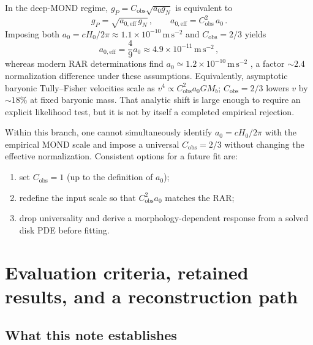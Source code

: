 \documentclass[aps,prd,reprint,superscriptaddress,nofootinbib,floatfix,showkeys]{revtex4-2}
\newcommand{\Cobs}{C_{\mathrm{obs}}}
\newcommand{\azero}{a_{0}}
\newcommand{\Hzero}{H_{0}}
\begin{document}
In the deep-MOND regime, \(g_{P}=\Cobs\sqrt{\azero g_{N}}\) is equivalent to
\begin{equation}
  g_{P}=\sqrt{a_{0,\mathrm{eff}}\,g_{N}}\,,
  \qquad
  a_{0,\mathrm{eff}} = \Cobs^{2}\,\azero\,.
  \label{eq:a0eff}
\end{equation}
Imposing both \(\azero=c\Hzero/2\pi\approx 1.1\times 10^{-10}\,\mathrm{m\,s^{-2}}\)
and \(\Cobs=2/3\) yields
\begin{equation}
  a_{0,\mathrm{eff}} = \frac{4}{9}\azero
  \approx 4.9\times 10^{-11}\,\mathrm{m\,s^{-2}}\,,
  \label{eq:a0eff-num}
\end{equation}
whereas modern RAR determinations find
\(a_0\simeq 1.2\times 10^{-10}\,\mathrm{m\,s^{-2}}\)
\cite{mcgaugh_rar,lelli_rar}, a factor \(\sim 2.4\) normalization difference
under these assumptions.
Equivalently, asymptotic baryonic Tully--Fisher velocities scale as
\(v^{4}\propto \Cobs^{2}\azero GM_{b}\); \(\Cobs=2/3\) lowers \(v\) by
\(\sim 18\%\) at fixed baryonic mass.  That analytic shift is large enough to
require an explicit likelihood test, but it is not by itself a completed
empirical rejection.

Within this branch, one cannot simultaneously identify
\(\azero=c\Hzero/2\pi\) with the empirical MOND scale and impose a universal
\(\Cobs=2/3\) without changing the effective normalization.  Consistent
options for a future fit are:
\begin{enumerate}
\item set \(\Cobs=1\) (up to the definition of \(\azero\));
\item redefine the input scale so that \(\Cobs^{2}\azero\) matches the RAR;
\item drop universality and derive a morphology-dependent response from a
  solved disk PDE before fitting.
\end{enumerate}

\section{Evaluation criteria, retained results, and a reconstruction path}
\label{sec:path}

\subsection{What this note establishes}
\end{document}
